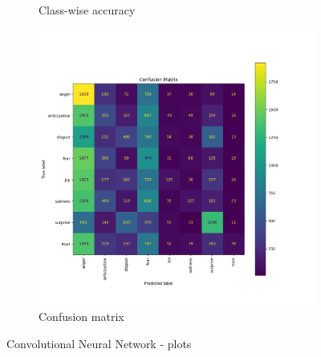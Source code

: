 \begin{figure}[H]
\begin{subfigure}{0.45\textwidth}
        \caption{Class-wise accuracy}
        \label{fig:cnn_classacc}
    \end{subfigure}
    \begin{subfigure}{0.6\textwidth}
        \includegraphics[width=\textwidth]{pictures/cnn_confusion_matrix.png}
        \caption{Confusion matrix}
        \label{fig:cnn_confmatr}
    \end{subfigure}
    \caption{Convolutional Neural Network - plots}
    \label{fig:cnn_performances}
\end{figure}



